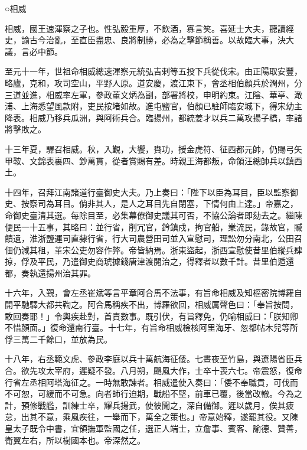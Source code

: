 \begin{pinyinscope}
 ○相威



 相威，國王速渾察之子也。性弘毅重厚，不飲酒，寡言笑。喜延士大夫，聽讀經史，諭古今治亂，至直臣盡忠、良將制勝，必為之擊節稱善。以故臨大事，決大議，言必中節。



 至元十一年，世祖命相威總速渾察元統弘吉剌等五投下兵從伐宋。由正陽取安豐，略廬，克和，攻司空山，平野人原。道安慶，渡江東下，會丞相伯顏兵於潤州，分三道並進，相威率左軍，參政董文炳為副，部署將校，申明約束。江陰、華亭、澉浦、上海悉望風款附，吏民按堵如故。進屯鹽官，伯顏已駐師臨安城下，得宋幼主降表。相威乃移兵瓜洲，與阿術兵合。臨揚州，都統姜才以兵二萬攻揚子橋，率諸將擊敗之。



 十三年夏，驛召相威。秋，入覲，大饗，賚功，授金虎符、征西都元帥，仍賜弓矢甲鞍、文錦表裏四、鈔萬貫，從者賞賜有差。時親王海都叛，命領汪總帥兵以鎮西土。



 十四年，召拜江南諸道行臺御史大夫。乃上奏曰：「陛下以臣為耳目，臣以監察御史、按察司為耳目。倘非其人，是人之耳目先自閉塞，下情何由上達。」帝嘉之，命御史臺清其選。每除目至，必集幕僚御史議其可否，不協公論者即劾去之。繼陳便民一十五事，其略曰：並行省，削冗官，鈐鎮戍，拘官船，業流民，錄故官，贓饋遺，淮浙鹽運司直隸行省，行大司農營田司並入宣慰司，理訟勿分南北，公田召佃仍減其租，革宋公吏勿容作弊。帝皆納焉。浙東盜起，浙西宣慰使昔里伯縱兵肆掠，俘及平民，乃遣御史商琥據錢唐津渡閱治之，得釋者以數千計。昔里伯遁還都，奏執還揚州治其罪。



 十六年，入覲，會左丞崔斌等言平章阿合馬不法事，有旨命相威及知樞密院博羅自開平馳驛大都共鞫之。阿合馬稱疾不出，博羅欲回，相威厲聲色曰：「奉旨按問，敢回奏耶！」令輿疾赴對，首責數事。既引伏，有旨釋免，仍喻相威曰：「朕知卿不惜顏面。」復命還南行臺。十七年，有旨命相威檢核阿里海牙、忽都帖木兒等所俘三萬二千餘口，並放為民。



 十八年，右丞範文虎、參政李庭以兵十萬航海征倭。七晝夜至竹島，與遼陽省臣兵合。欲先攻太宰府，遲疑不發。八月朔，颶風大作，士卒十喪六七。帝震怒，復命行省左丞相阿塔海征之。一時無敢諫者。相威遣使入奏曰：「倭不奉職貢，可伐而不可恕，可緩而不可急。向者師行迫期，戰船不堅，前車已覆，後當改轍。今為之計，預修戰艦，訓練士卒，耀兵揚武，使彼聞之，深自備御。遲以歲月，俟其疲怠，出其不意，乘風疾往，一舉而下，萬全之策也。」帝意始釋，遂罷其役。又陳皇太子既令中書，宜領撫軍監國之任，選正人端士，立詹事、賓客、諭德、贊善，衛翼左右，所以樹國本也。帝深然之。




\end{pinyinscope}

